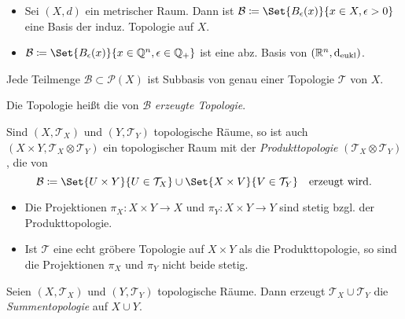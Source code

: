\documentclass{cheat-sheet}
\newcommand{\Tau}{\mathcal{T}} %
\begin{document}
\begin{bspe}
  \begin{itemize}
    \item Sei $(X, d)$ ein metrischer Raum. Dann ist $\mathcal{B} \coloneqq \Set{B_\epsilon(x)}{x \in X, \epsilon > 0}$ eine Basis der induz. Topologie auf $X$.
    \item $\mathcal{B} \coloneqq \Set{B_\epsilon(x)}{x \in \Q^n, \epsilon \in \Q_{+}}$ ist eine abz. Basis von $(\mathbb{R}^n, \mathrm{d}_{\text{eukl}})$.
  \end{itemize}
\end{bspe}

\begin{prop}
  Jede Teilmenge $\mathcal{B} \subset \mathcal{P}(X)$ ist Subbasis von genau einer Topologie $\Tau$ von $X$.
\end{prop}

\begin{defn}
  Die Topologie heißt die von $\mathcal{B}$ \emph{erzeugte Topologie}.
\end{defn}

\begin{defn}
  Sind $(X, \Tau_X)$ und $(Y, \Tau_Y)$ topologische Räume, so ist auch $(X \times Y, \Tau_X \otimes \Tau_Y)$ ein topologischer Raum mit der \emph{Produkttopologie} $(\Tau_X \otimes \Tau_Y)$, die von
  \[
    \mathcal{B} \coloneqq \Set{U \times Y}{U \in \Tau_X} \cup \Set{X \times V}{V \in \Tau_Y}
    \quad \text{erzeugt wird.}
  \]
\end{defn}

\begin{prop}
  \begin{itemize}
    \item Die Projektionen $\pi_X : X \times Y \to X$ und $\pi_Y : X \times Y \to Y$ sind stetig bzgl. der Produkttopologie.
    \item Ist $\Tau$ eine echt gröbere Topologie auf $X \times Y$ als die Produkttopologie, so sind die Projektionen $\pi_X$ und $\pi_Y$ nicht beide stetig.
  \end{itemize}
\end{prop}


\begin{defn}
  Seien $(X, \Tau_X)$ und $(Y, \Tau_Y)$ topologische Räume. Dann erzeugt $\Tau_X \cup \Tau_Y$ die \emph{Summentopologie} auf $X \cup Y$.
\end{defn}
\end{document}
